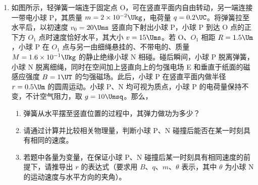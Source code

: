 \documentclass[\gkver]{gaokaozhenti}
\begin{document}
\begin{enumerate}
{$-\mu mgL=\frac{1}{2}mv_1^2-\frac{1}{2}mv_0^2$ ①

$v_1=\sqrt{v_0^2-2\mu gL}$ ②

（2）由题意可知，电场方向如图，若小滑块能通过位置 $p$，则小滑块可沿挡板运动且通过位置 $p_5$，设小滑块在位置 $p$ 的速度为 $v$，受到的挡板的弹力为 $N$，匀强电场的电场强度为 $E$，由动能定理有：

$-\mu mgL-2rEqs=\frac{1}{2}mv_1^2-\frac{1}{2}mv_0^2$ ③

当滑块在位置 $p$ 时，由牛顿第二定律有：$N+Eq=m\frac{v^2}{r}$ ④

由题意有：$N\geq0$ ⑤

由以上三式可得：$E\leq\frac{m(v_0^2-2\mu gL)}{5qr}$ ⑥

$E$ 的取值范围：$0<E\leq\frac{m(v_0^2-2\mu gL)}{5qr}$ ⑦


（3）设线圈产生的电动势为 $E_1$，其电阻为 $R$，平行板电容器两端的电压为 $U$，$t$ 时间内磁感应强度的变化量为 $\Delta B$，得：

$U=Ed$ ⑧

由法拉第电磁感应定律得 $E_1=n\frac{\Delta BS}{t}$ ⑨

由全电路的欧姆定律得 $E_1=I(R+2R)$ ⑩

$U=2RI$

经过时间 $t$，磁感应强度变化量的取值范围：$0<\Delta B\leq\frac{3md(v_0^2-2\mu gL)}{10nSqr}t$。
}

\item
如图所示，轻弹簧一端连于固定点 O，可在竖直平面内自由转动，另一端连接一带电小球 P，其质量 $m=2\times10^{-2}\Ukg$，电荷量 $q=0.2\UC$。将弹簧拉至水平后，以初速度 $v_{0}=20\Ums$ 竖直向下射出小球 P，小球 P 到达 O 点的正下方 $O_1$ 点时速度恰好水平，其大小 $v=15\Ums$。若 O、$O_1$ 相距 $R=1.5\Um$，小球 P 在 $O_1$ 点与另一由细绳悬挂的、不带电的、质量 $M=1.6\times10^{-1}\Ukg$ 的静止绝缘小球 N 相碰。碰后瞬间，小球 P 脱离弹簧，小球 N 脱离细绳，同时在空间加上竖直向上的匀强电场 E 和垂直于纸面的磁感应强度 $B=1\UT$ 的匀强磁场。此后，小球 P 在竖直平面内做半径 $r=0.5\Um$ 的圆周运动。小球 P、N 均可视为质点，小球 P 的电荷量保持不变，不计空气阻力，取 $g=10\Umsq$。那么，

\begin{enumerate}
	\item
	弹簧从水平摆至竖直位置的过程中，其弹力做功为多少？
	\item
	请通过计算并比较相关物理量，判断小球 P、N 碰撞后能否在某一时刻具有相同的速度。
	\item
	若题中各量为变量，在保证小球 P、N 碰撞后某一时刻具有相同速度的前提下，请推导出 $r$ 的表达式（要求用 $B$、$q$、$m$、$\theta$ 表示，其中 $\theta$ 为小球 N 的运动速度与水平方向的夹角）。
\end{enumerate}


\end{enumerate}
\end{document}
